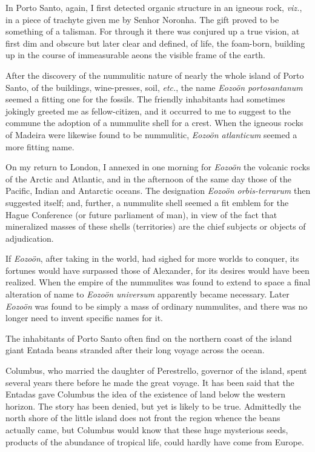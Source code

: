 \documentclass[a4paper, 12pt, oneside]{article}
\begin{document}
In Porto Santo, again, I first detected organic structure in an igneous rock, \emph{viz.}, in a piece of trachyte given me by Senhor Noronha. The gift proved to be something of a talisman. For through it there was conjured up a true vision, at first dim and obscure but later clear and defined, of life, the foam-born, building up in the course of immeasurable aeons the visible frame of the earth.

After the discovery of the nummulitic nature of nearly the whole island of Porto Santo, of the buildings, wine-presses, soil, \emph{etc.}, the name \emph{Eozoön portosantanum} seemed a fitting one for the fossils. The friendly inhabitants had sometimes jokingly greeted me as fellow-citizen, and it occurred to me to suggest to the commune the adoption of a nummulite shell for a crest. When the igneous rocks of Madeira were likewise found to be nummulitic, \emph{Eozoön atlanticum} seemed a more fitting name.

On my return to London, I annexed in one morning for \emph{Eozoön} the volcanic rocks of the Arctic and Atlantic, and in the afternoon of the same day those of the Pacific, Indian and Antarctic oceans. The designation \emph{Eozoön orbis-terrarum} then suggested itself; and, further, a nummulite shell seemed a fit emblem for the Hague Conference (or future parliament of man), in view of the fact that mineralized masses of these shells (territories) are the chief subjects or objects of adjudication.

If \emph{Eozoön}, after taking in the world, had sighed for more worlds to conquer, its fortunes would have surpassed those of Alexander, for its desires would have been realized. When the empire of the nummulites was found to extend to space a final alteration of name to \emph{Eozoön universum} apparently became necessary. Later \emph{Eozoön} was found to be simply a mass of ordinary nummulites, and there was no longer need to invent specific names for it.

The inhabitants of Porto Santo often find on the northern coast of the island giant Entada beans stranded after their long voyage across the ocean.

Columbus, who married the daughter of Perestrello, governor of the island, spent several years there before he made the great voyage. It has been said that the Entadas gave Columbus the idea of the existence of land below the western horizon. The story has been denied, but yet is likely to be true. Admittedly the north shore of the little island does not front the region whence the beans actually came, but Columbus would know that these huge mysterious seeds, products of the abundance of tropical life, could hardly have come from Europe.
\end{document}
